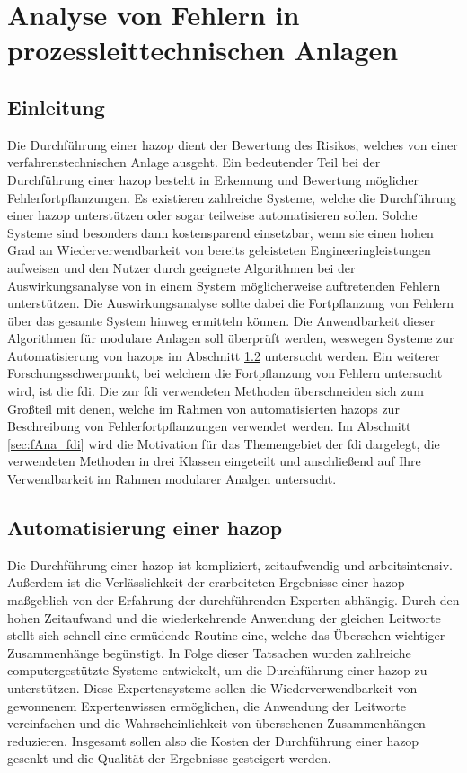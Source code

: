 \chapter{Analyse von Fehlern in prozessleittechnischen Anlagen} \label{ch:fehlerfortpfl}
\section{Einleitung}
Die Durchf\"uhrung einer \ac{hazop} dient der Bewertung des Risikos, welches von einer verfahrenstechnischen Anlage ausgeht. Ein bedeutender Teil bei der Durchf\"uhrung einer \ac{hazop} besteht in Erkennung und Bewertung m\"oglicher Fehlerfortpflanzungen. \newline
Es existieren zahlreiche Systeme, welche die Durchf\"uhrung einer \ac{hazop} unterst\"utzen oder sogar teilweise automatisieren sollen. Solche Systeme sind besonders dann kostensparend einsetzbar, wenn sie einen hohen Grad an Wiederverwendbarkeit von bereits geleisteten Engineeringleistungen aufweisen und den Nutzer durch geeignete Algorithmen bei der Auswirkungsanalyse von in einem System m\"oglicherweise auftretenden Fehlern unterst\"utzen. Die Auswirkungsanalyse sollte dabei die Fortpflanzung von Fehlern \"uber das gesamte System hinweg ermitteln k\"onnen. Die Anwendbarkeit dieser Algorithmen f\"ur modulare Anlagen soll \"uberpr\"uft werden, weswegen Systeme zur Automatisierung von \acp{hazop} im Abschnitt \ref{sec:fAna_automatHazop} untersucht werden. \newline
Ein weiterer Forschungsschwerpunkt, bei welchem die Fortpflanzung von Fehlern untersucht wird, ist die \ac{fdi}. Die zur \ac{fdi} verwendeten Methoden \"uberschneiden sich zum Gro\ss{}teil mit denen, welche im Rahmen von automatisierten \acp{hazop} zur Beschreibung von Fehlerfortpflanzungen verwendet werden. Im Abschnitt \ref{sec:fAna_fdi} wird die Motivation f\"ur das Themengebiet der \ac{fdi} dargelegt, die verwendeten Methoden in drei Klassen eingeteilt und anschlie\ss{}end auf Ihre Verwendbarkeit im Rahmen modularer Analgen untersucht. 

\section{Automatisierung einer \ac{hazop}} \label{sec:fAna_automatHazop}
Die Durchf\"uhrung einer \ac{hazop} ist kompliziert, zeitaufwendig und arbeitsintensiv. Au\ss{}erdem ist die Verl\"asslichkeit der erarbeiteten Ergebnisse einer \ac{hazop} ma\ss{}geblich von der Erfahrung der durchf\"uhrenden Experten abh\"angig. Durch den hohen Zeitaufwand und die wiederkehrende Anwendung der gleichen Leitworte stellt sich schnell eine erm\"udende Routine eine, welche das \"Ubersehen wichtiger Zusammenh\"ange beg\"unstigt. In Folge dieser Tatsachen wurden zahlreiche computergest\"utzte Systeme entwickelt, um die Durchf\"uhrung einer \ac{hazop} zu unterst\"utzen. Diese Expertensysteme sollen die Wiederverwendbarkeit von gewonnenem Expertenwissen erm\"oglichen, die Anwendung der Leitworte vereinfachen und die Wahrscheinlichkeit von \"ubersehenen Zusammenh\"angen reduzieren. Insgesamt sollen also die Kosten der Durchf\"uhrung einer \ac{hazop} gesenkt und die Qualit\"at der Ergebnisse gesteigert werden. 

